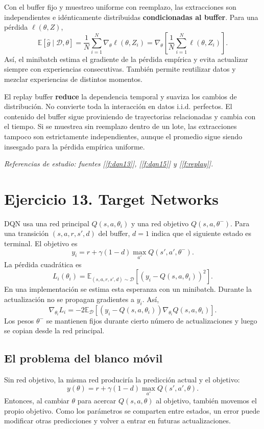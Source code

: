 \documentclass[11pt,a4paper]{article}
\newcommand{\E}{\mathbb{E}}
\newcommand{\apartado}[1]{\subsection*{#1}}
\begin{document}
Con el buffer fijo y muestreo uniforme con reemplazo, las extracciones son independientes e idénticamente distribuidas \textbf{condicionadas al buffer}. Para una pérdida $\ell(\theta,Z)$,
\[
\E[\widehat g\mid\mathcal D,\theta]
=\frac1N\sum_{i=1}^N\nabla_\theta\ell(\theta,Z_i)
=\nabla_\theta\left[\frac1N\sum_{i=1}^N\ell(\theta,Z_i)\right].
\]
Así, el minibatch estima el gradiente de la pérdida empírica y evita actualizar siempre con experiencias consecutivas. También permite reutilizar datos y mezclar experiencias de distintos momentos.

El replay buffer \textbf{reduce} la dependencia temporal y suaviza los cambios de distribución. No convierte toda la interacción en datos i.i.d. perfectos. El contenido del buffer sigue proviniendo de trayectorias relacionadas y cambia con el tiempo. Si se muestrea sin reemplazo dentro de un lote, las extracciones tampoco son estrictamente independientes, aunque el promedio sigue siendo insesgado para la pérdida empírica uniforme.

\textit{Referencias de estudio: fuentes [\ref{f:dqn13}], [\ref{f:dqn15}] y [\ref{f:replay}].}

\section{Ejercicio 13. Target Networks}

DQN usa una red principal $Q(s,a,\theta_i)$ y una red objetivo $Q(s,a,\theta^-)$. Para una transición $(s,a,r,s',d)$ del buffer, $d=1$ indica que el siguiente estado es terminal. El objetivo es
\[
y_i=r+\gamma(1-d)\max_{a'}Q(s',a',\theta^-).
\]
La pérdida cuadrática es
\[
\boxed{L_i(\theta_i)=\E_{(s,a,r,s',d)\sim\mathcal D}
\left[\left(y_i-Q(s,a,\theta_i)\right)^2\right].}
\]
En una implementación se estima esta esperanza con un minibatch. Durante la actualización no se propagan gradientes a $y_i$. Así,
\[
\nabla_{\theta_i}L_i
=-2\E_{\mathcal D}\left[(y_i-Q(s,a,\theta_i))
\nabla_{\theta_i}Q(s,a,\theta_i)\right].
\]
Los pesos $\theta^-$ se mantienen fijos durante cierto número de actualizaciones y luego se copian desde la red principal.

\apartado{El problema del blanco móvil}
Sin red objetivo, la misma red produciría la predicción actual y el objetivo:
\[
y(\theta)=r+\gamma(1-d)\max_{a'}Q(s',a',\theta).
\]
Entonces, al cambiar $\theta$ para acercar $Q(s,a,\theta)$ al objetivo, también movemos el propio objetivo. Como los parámetros se comparten entre estados, un error puede modificar otras predicciones y volver a entrar en futuras actualizaciones.
\end{document}
